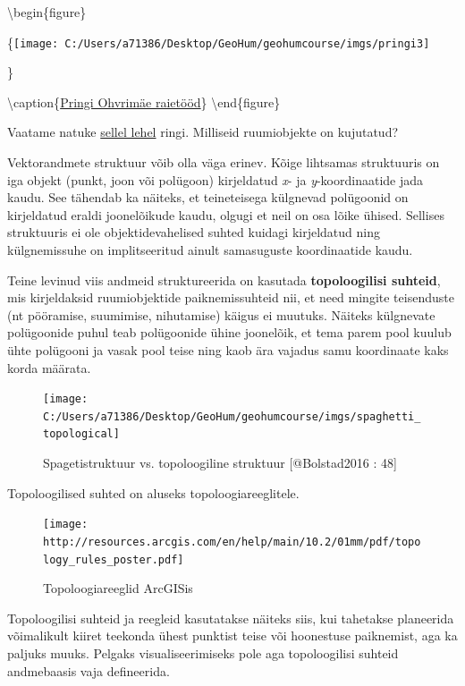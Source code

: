 \documentclass[
]{book}
\begin{document}
\textbackslash begin\{figure\}

\{\centering \texttt{[image: C:/Users/a71386/Desktop/GeoHum/geohumcourse/imgs/pringi3]}

\}

\textbackslash caption\{\href{http://hiis.ee/files/ryystatud_pyhapaigad_2018.pdf}{Pringi Ohvrimäe raietööd}\}\label{fig:pringi3}
\textbackslash end\{figure\}

Vaatame natuke \href{http://orbis.stanford.edu/}{sellel lehel} ringi. Milliseid ruumiobjekte on kujutatud?

Vektorandmete struktuur võib olla väga erinev. Kõige lihtsamas struktuuris on iga objekt (punkt, joon või polügoon) kirjeldatud \emph{x}- ja \emph{y}-koordinaatide jada kaudu. See tähendab ka näiteks, et teineteisega külgnevad polügoonid on kirjeldatud eraldi joonelõikude kaudu, olgugi et neil on osa lõike ühised. Sellises struktuuris ei ole objektidevahelised suhted kuidagi kirjeldatud ning külgnemissuhe on implitseeritud ainult samasuguste koordinaatide kaudu.

Teine levinud viis andmeid struktureerida on kasutada \textbf{topoloogilisi suhteid}, mis kirjeldaksid ruumiobjektide paiknemissuhteid nii, et need mingite teisenduste (nt pööramise, suumimise, nihutamise) käigus ei muutuks. Näiteks külgnevate polügoonide puhul teab polügoonide ühine joonelõik, et tema parem pool kuulub ühte polügooni ja vasak pool teise ning kaob ära vajadus samu koordinaate kaks korda määrata.

\begin{figure}

{\centering \texttt{[image: C:/Users/a71386/Desktop/GeoHum/geohumcourse/imgs/spaghetti\_topological]} 

}

\caption{Spagetistruktuur vs. topoloogiline struktuur [@Bolstad2016 : 48]}\label{fig:spaghetti-topological}
\end{figure}

Topoloogilised suhted on aluseks topoloogiareeglitele.

\begin{figure}
\centering
\texttt{[image: http://resources.arcgis.com/en/help/main/10.2/01mm/pdf/topology\_rules\_poster.pdf]}
\caption{Topoloogiareeglid ArcGISis}
\end{figure}

Topoloogilisi suhteid ja reegleid kasutatakse näiteks siis, kui tahetakse planeerida võimalikult kiiret teekonda ühest punktist teise või hoonestuse paiknemist, aga ka paljuks muuks. Pelgaks visualiseerimiseks pole aga topoloogilisi suhteid andmebaasis vaja defineerida.
\end{document}
